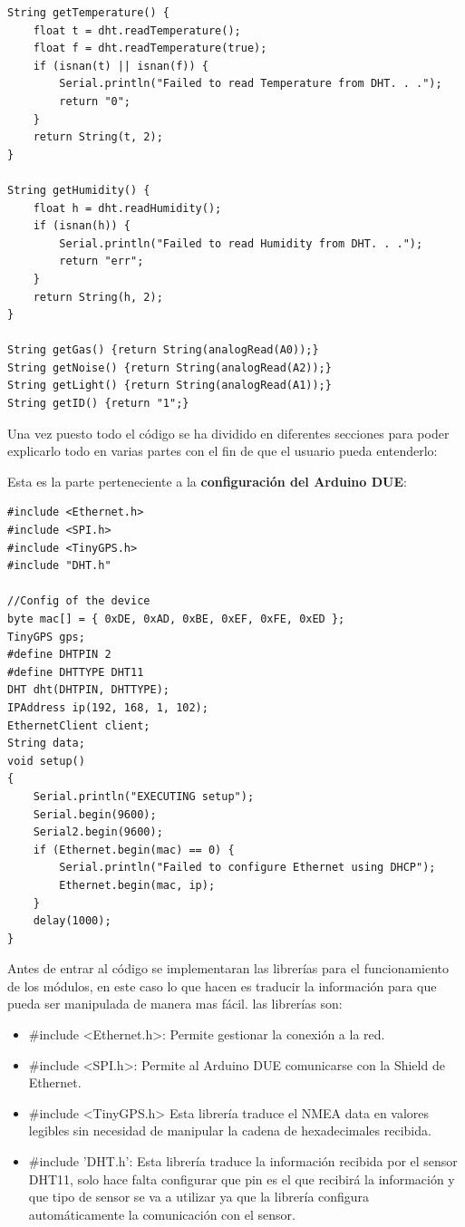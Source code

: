 \begin{lstlisting}[caption=Codigo de la Controladora Arduino Due, label=boardconf]
String getTemperature() {
	float t = dht.readTemperature();
	float f = dht.readTemperature(true);
	if (isnan(t) || isnan(f)) {
		Serial.println("Failed to read Temperature from DHT. . .");
		return "0";
	}
	return String(t, 2);
}

String getHumidity() {
	float h = dht.readHumidity();
	if (isnan(h)) {
		Serial.println("Failed to read Humidity from DHT. . .");
		return "err";
	}
	return String(h, 2);
}

String getGas() {return String(analogRead(A0));}
String getNoise() {return String(analogRead(A2));}
String getLight() {return String(analogRead(A1));}
String getID() {return "1";}

\end{lstlisting}

Una vez puesto todo el código se ha dividido en diferentes secciones para poder explicarlo todo en varias partes con el fin de que el usuario pueda entenderlo:

Esta es la parte perteneciente a la \textbf{configuración del Arduino DUE}:

\begin{lstlisting}[caption=Configuración de la Controladora Arduino Due, label=boardconf]
#include <Ethernet.h>
#include <SPI.h>
#include <TinyGPS.h>
#include "DHT.h"

//Config of the device
byte mac[] = { 0xDE, 0xAD, 0xBE, 0xEF, 0xFE, 0xED };
TinyGPS gps;
#define DHTPIN 2  
#define DHTTYPE DHT11  
DHT dht(DHTPIN, DHTTYPE);
IPAddress ip(192, 168, 1, 102);
EthernetClient client;
String data;
void setup()
{  
	Serial.println("EXECUTING setup");
	Serial.begin(9600);
	Serial2.begin(9600);
	if (Ethernet.begin(mac) == 0) {
		Serial.println("Failed to configure Ethernet using DHCP");
		Ethernet.begin(mac, ip);
	}
	delay(1000);  
}
\end{lstlisting}

Antes de entrar al código se implementaran las librerías para el funcionamiento de los módulos, en este caso lo que hacen es traducir la información para que pueda ser manipulada de manera mas fácil. las librerías son:

\begin{itemize}
	\item \#include <Ethernet.h>: Permite gestionar la conexión a la red.
	\item \#include <SPI.h>: Permite al Arduino DUE comunicarse con la Shield de Ethernet.
	\item \#include <TinyGPS.h> Esta librería traduce el NMEA data en valores legibles sin necesidad de manipular la cadena de hexadecimales recibida.
	\item \#include 'DHT.h':  Esta librería traduce la información recibida por el sensor DHT11, solo hace falta configurar que pin es el que recibirá la información y que tipo de sensor se va a utilizar ya que la librería configura automáticamente la comunicación con el sensor.
\end{itemize}

